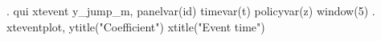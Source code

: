 . qui xtevent y_jump_m, panelvar(id) timevar(t) policyvar(z) window(5)
{\smallskip}
. xteventplot, ytitle("Coefficient") xtitle("Event time") 
